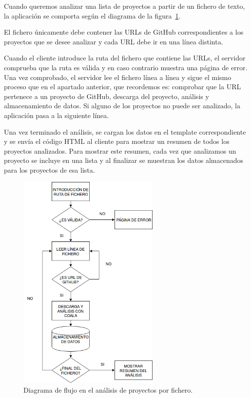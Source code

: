 \documentclass[a4paper, 12pt]{book}
\begin{document}
Cuando queremos analizar una lista de proyectos a partir de un fichero de texto, la aplicación se comporta según el diagrama de la figura~\ref{fig:AnalizarFichero}.

El fichero únicamente debe contener las URLs de GitHub correspondientes a los proyectos que se desee analizar y cada URL debe ir en una línea distinta.

Cuando el cliente introduce la ruta del fichero que contiene las URLs, el servidor comprueba que la ruta es válida y en caso contrario muestra una página de error. Una vez comprobado, el servidor lee el fichero línea a línea y sigue el mismo proceso que en el apartado anterior, que recordemos es: comprobar que la URL pertenece a un proyecto de GitHub, descarga del proyecto, análisis y almacenamiento de datos. Si alguno de los proyectos no puede ser analizado, la aplicación pasa a la siguiente línea.

Una vez terminado el análisis, se cargan los datos en el template correspondiente y se envía el código HTML al cliente para mostrar un resumen de todos los proyectos analizados. Para mostrar este resumen, cada vez que analizamos un proyecto se incluye en una lista y al finalizar se muestran los datos almacenados para los proyectos de esa lista.

\begin{figure}[H]
  \centering
  \includegraphics[width=7cm, keepaspectratio]{img/AnalizarFichero}
  \caption{Diagrama de flujo en el análisis de proyectos por fichero.}
  \label{fig:AnalizarFichero}
\end{figure}
\end{document}
